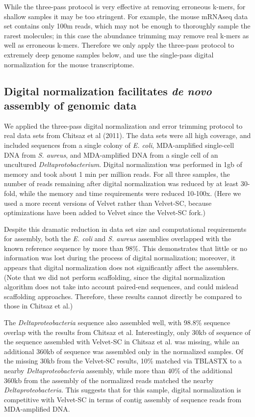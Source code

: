 \documentclass[10pt]{article}
\begin{document}
While the three-pass protocol is very effective at removing erroneous k-mers,
for shallow samples it may be too stringent.  For example, the mouse
mRNAseq data set contains only 100m reads, which may not be enough to
thoroughly sample the rarest molecules; in this case the abundance trimming
may remove real k-mers as well as erroneous k-mers.  Therefore we only
apply the three-pass protocol to extremely deep genome samples below,
and use the single-pass digital normalization for the mouse transcriptome.

\subsection*{Digital normalization facilitates {\em de novo} assembly of genomic data}

We applied the three-pass digital normalization and error trimming
protocol to real data sets from Chitsaz et al (2011).  The data sets
were all high coverage, and included sequences from a single colony of
{\em E. coli}, MDA-amplified single-cell DNA from {\em S. aureus}, and
MDA-amplified DNA from a single cell of an uncultured {\em
  Deltaprotobacterium}.  Digital normalization was performed in 1gb of
memory and took about 1 min per million reads.  For all three samples,
the number of reads remaining after digital normalization was reduced
by at least 30-fold, while the memory and time requirements were
reduced 10-100x.  (Here we used a more recent versions of Velvet
rather than Velvet-SC, because optimizations have been added to Velvet
since the Velvet-SC fork.)

Despite this dramatic reduction in data set size and computational
requirements for assembly, both the {\em E. coli} and {\em S. aureus}
assemblies overlapped with the known reference sequence by more than
98\%.  This demonstrates that little or no information was lost during
the process of digital normalization; moreover, it appears that
digital normalization does not significantly affect the assemblers.
(Note that we did not perform scaffolding, since the digital
normalization algorithm does not take into account paired-end
sequences, and could mislead scaffolding approaches.  Therefore, these
results cannot directly be compared to those in Chitsaz et al.)

The {\em Deltaproteobacteria} sequence also assembled well, with
98.8\% sequence overlap with the results from Chitsaz et al.
Interestingly, only 30kb of sequence of the sequence assembled with
Velvet-SC in Chitsaz et al. was missing, while an additional 360kb of
sequence was assembled only in the normalized samples.  Of the missing
30kb from the Velvet-SC results, 10\% matched via TBLASTX to a nearby
{\em Deltaproteobacteria} assembly, while more than 40\% of the
additional 360kb from the assembly of the normalized reads matched the
nearby {\em Deltaproteobacteria}.  This suggests that for this sample,
digital normalization is competitive with Velvet-SC in terms of contig
assembly of sequence reads from MDA-amplified DNA.
\end{document}

